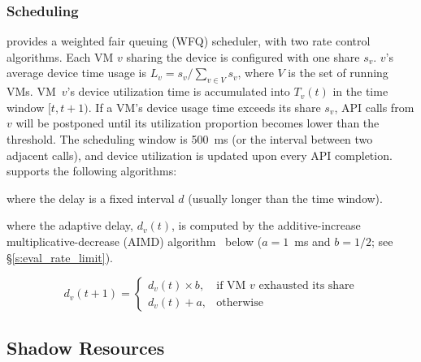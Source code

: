 \subsubsection{Scheduling}
\label{sub:scheduling}
\AvA provides a weighted fair queuing (WFQ) scheduler, with two rate control algorithms.
Each VM $v$ sharing the device is configured with one share $s_v$.
$v$'s average device time usage is $L_v=s_v/\sum_{v\in V} s_v$, where $V$ is the set of running VMs.
VM~$v$'s device utilization time is accumulated into $T_v(t)$ in the time window $[t, t+1)$.
If a VM's device usage time exceeds its share $s_v$,
API calls from $v$ will be postponed until its utilization proportion becomes lower than the threshold.
The scheduling window is 500~ms (or the interval between two adjacent calls),
and device utilization is updated upon every API completion.
\AvA supports the following algorithms:

 where the delay is a fixed interval $d$ (usually longer than the time window).

 where the adaptive delay, $d_v(t)$, is computed by the additive-increase multiplicative-decrease (AIMD) algorithm~\cite{aimd} below ($a=1$~ms and $b=1/2$; see \S\ref{s:eval_rate_limit}).

\[
d_v\left(t+1\right)=\begin{cases}
d_v\left(t\right)\times b, &\textrm{if VM $v$ exhausted its share}\\
d_v\left(t\right)+a, &\textrm{otherwise}
\end{cases}
\]

\subsection{Shadow Resources}
\label{s:multi_thread}
\label{s:shadow_buffer}

